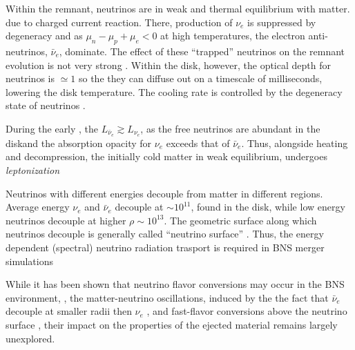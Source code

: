 Within the remnant, neutrinos are in weak and thermal equilibrium with matter.
due to charged current reaction. There, production of $\nu_e$ is suppressed by 
degeneracy and as $\mu_n-\mu_p+\mu_e<0$ at high temperatures, the electron 
anti-neutrinos, $\bar{\nu}_{e}$, dominate. The effect of these ``trapped'' 
neutrinos on the remnant evolution is not very strong \cite{Foucart:2015gaa,Perego:2019adq}.
%
Within the disk, however, the optical depth for neutrinos is ${\simeq}1$ so 
the they can diffuse out on a timescale of milliseconds, lowering the disk 
temperature. The cooling rate is controlled by the degeneracy state of neutrinos 
\cite{Beloborodov:2008nx}.

During the early \pmerg{}, the $L_{\bar{\nu}_e}\gtrsim L_{\nu_e}$, as the 
free neutrinos are abundant in the diskand the absorption opacity for $\nu_e$ 
exceeds that of $\bar{\nu}_e$.
Thus, alongside heating and decompression, the initially cold matter in weak 
equilibrium, undergoes \textit{leptonization} 
\cite{Perego:2014fma,Endrizzi:2019trv}

Neutrinos with different energies decouple from matter in different regions.
Average energy $\nu_{e}$ and $\bar{\nu}_e$ decouple at ${\sim}10^{11}$\gcm, found 
in the disk, while low energy neutrinos decouple at higher $\rho\sim10^{13}$\gcm.
The geometric surface along which neutrinos decouple is generally called ``neutrino 
surface'' \cite{Perego:2014fma,Endrizzi:2019trv}.
Thus, the energy dependent (spectral) neutrino radiation trasport is required in 
\ac{BNS} merger simulations

While it has been shown that neutrino flavor conversions may occur in the \ac{BNS} 
\pmerg{} environment, \eg, the matter-neutrino oscillations, induced by the 
the fact that $\bar{\nu}_e$ decouple at smaller radii then $\nu_{e}$ \citep[\eg][]{Zhu:2016mwa,Tian:2017xbr}, 
and fast-flavor conversions above the neutrino surface \cite{Wu:2017drk}, their impact 
on the properties of the ejected material remains largely unexplored.

